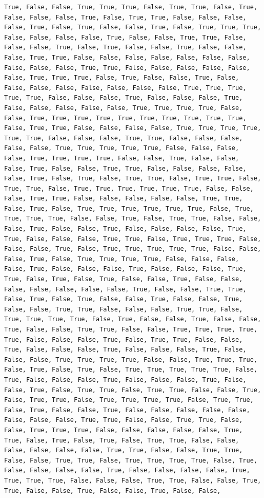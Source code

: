 \documentclass[
  letterpaper,
  DIV=11,
  numbers=noendperiod]{scrartcl}
\begin{document}
\begin{verbatim}
True, False, False, True, True, True, False, True, True, False, True, False, False, False, True, False, True, True, False, False, False, False, True, False, True, False, False, True, False, True, True, True, False, False, False, False, True, False, False, True, True, False, False, False, True, False, True, False, False, True, False, False, False, True, True, False, False, False, False, False, False, False, False, False, False, True, True, False, False, False, False, False, False, True, True, True, False, True, False, False, True, False, False, False, False, False, False, False, False, True, True, True, True, True, False, False, False, True, False, False, False, True, False, False, False, False, False, True, True, True, True, False, False, True, True, True, True, True, True, True, True, True, True, False, True, True, False, False, False, False, True, True, True, True, True, True, False, False, False, True, True, False, False, False, False, False, True, True, True, True, True, False, False, False, False, True, True, True, True, False, False, True, False, False, False, True, False, False, True, True, False, False, False, False, False, True, False, True, False, True, True, False, True, True, False, True, True, False, True, True, True, True, True, True, False, False, False, True, True, False, False, False, False, False, True, True, False, True, False, True, True, True, True, True, True, False, True, True, True, True, False, False, True, False, True, True, False, False, False, True, False, False, True, False, False, False, False, True, True, False, False, False, True, True, False, True, True, True, False, False, False, True, False, True, True, True, True, True, False, False, False, True, False, True, True, True, True, False, False, False, False, True, False, False, False, True, False, False, False, True, True, False, True, False, True, False, False, True, False, False, False, False, False, False, False, True, False, False, True, True, False, True, False, True, False, False, True, False, False, True, False, False, True, True, False, False, False, True, True, False, True, True, True, True, False, True, False, False, True, False, False, True, False, False, True, True, False, False, True, True, True, True, True, False, False, False, True, False, True, True, False, False, True, False, False, False, True, False, False, False, True, False, False, False, True, True, True, True, False, False, True, True, True, False, True, False, True, False, True, True, True, True, True, False, True, False, False, False, True, False, False, False, True, False, False, True, False, True, True, False, True, True, False, False, True, False, True, True, False, True, True, True, True, False, True, True, False, True, False, False, True, False, False, False, False, False, False, False, False, True, True, False, False, True, True, False, False, True, True, True, False, False, False, False, False, True, True, False, True, False, True, False, True, True, False, False, False, False, False, False, True, True, False, False, True, True, False, False, True, True, False, True, True, True, True, False, True, False, False, False, False, True, False, False, False, False, True, True, True, True, False, False, False, True, True, False, False, True, True, False, False, True, False, False, True, False, False, 
\end{verbatim}
\end{document}
